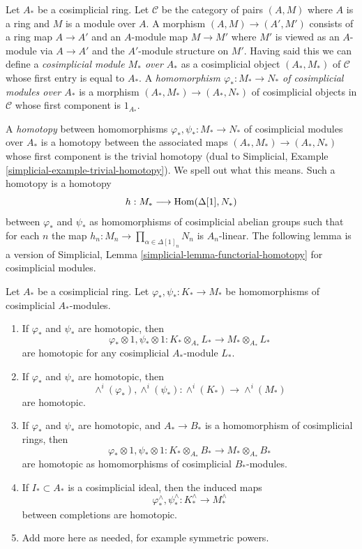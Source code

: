 \medskip\noindent
Let $A_*$ be a cosimplicial ring. Let $\mathcal{C}$ be the category
of pairs $(A, M)$ where $A$ is a ring and $M$ is a module over $A$.
A morphism $(A, M) \to (A', M')$ consists of a ring map $A \to A'$ and
an $A$-module map $M \to M'$ where $M'$ is viewed as an $A$-module
via $A \to A'$ and the $A'$-module structure on $M'$. Having said this
we can define a {\it cosimplicial module $M_*$ over $A_*$} as a cosimplicial
object $(A_*, M_*)$ of $\mathcal{C}$ whose first entry is equal to $A_*$.
A {\it homomorphism $\varphi_* : M_* \to N_*$ of cosimplicial modules over
$A_*$} is a morphism $(A_*, M_*) \to (A_*, N_*)$ of cosimplicial objects
in $\mathcal{C}$ whose first component is $1_{A_*}$.

\medskip\noindent
A {\it homotopy} between homomorphisms $\varphi_*, \psi_* : M_* \to N_*$
of cosimplicial modules over $A_*$ is a homotopy between the associated
maps $(A_*, M_*) \to (A_*, N_*)$ whose first component is the
trivial homotopy (dual to
Simplicial, Example \ref{simplicial-example-trivial-homotopy}).
We spell out what this means. Such a homotopy is a homotopy
$$
h : M_* \longrightarrow \mathop{\mathrm{Hom}}\nolimits(\Delta[1], N_*)
$$
between $\varphi_*$ and $\psi_*$ as homomorphisms of cosimplicial abelian
groups such that for each $n$ the map
$h_n : M_n \to \prod_{\alpha \in \Delta[1]_n} N_n$ is $A_n$-linear.
The following lemma is a version of
Simplicial, Lemma \ref{simplicial-lemma-functorial-homotopy}
for cosimplicial modules.

\begin{lemma}
\label{lemma-homotopy-tensor}
Let $A_*$ be a cosimplicial ring. Let $\varphi_*, \psi_* : K_* \to M_*$
be homomorphisms of cosimplicial $A_*$-modules.
\begin{enumerate}
\item
\label{item-tensor}
If $\varphi_*$ and $\psi_*$ are homotopic, then
$$
\varphi_* \otimes 1, \psi_* \otimes 1 :
K_* \otimes_{A_*} L_* \longrightarrow M_* \otimes_{A_*} L_*
$$
are homotopic for any cosimplicial $A_*$-module $L_*$.
\item
\label{item-wedge}
If $\varphi_*$ and $\psi_*$ are homotopic, then
$$
\wedge^i(\varphi_*), \wedge^i(\psi_*) :
\wedge^i(K_*) \longrightarrow \wedge^i(M_*)
$$
are homotopic.
\item
\label{item-base-change}
If $\varphi_*$ and $\psi_*$ are homotopic, and $A_* \to B_*$
is a homomorphism of cosimplicial rings, then
$$
\varphi_* \otimes 1, \psi_* \otimes 1 :
K_* \otimes_{A_*} B_* \longrightarrow M_* \otimes_{A_*} B_*
$$
are homotopic as homomorphisms of cosimplicial $B_*$-modules.
\item
\label{item-completion}
If $I_* \subset A_*$ is a cosimplicial ideal, then the induced
maps
$$
\varphi^\wedge_*, \psi^\wedge_* :
K_*^\wedge \longrightarrow M_*^\wedge
$$
between completions are homotopic.
\item Add more here as needed, for example symmetric powers.
\end{enumerate}
\end{lemma}

